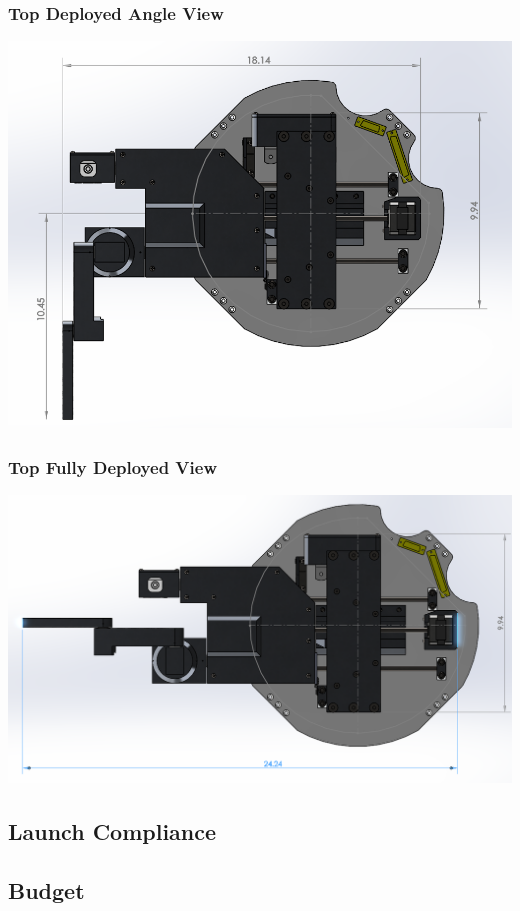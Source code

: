 \subsubsection{Top Deployed Angle View}
\includegraphics[width=\textwidth]{./images/CAD/TOP_DEPLOYED_ANGLE}
\subsubsection{Top Fully Deployed View}
\includegraphics[width=\textwidth]{./images/CAD/TOP_DEPLOYED_FULL}

\subsection{Launch Compliance}
\subsection{Budget}
